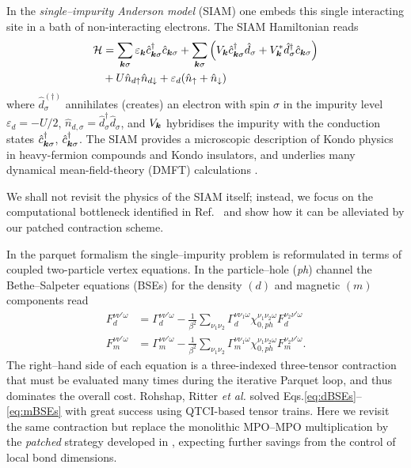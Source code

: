 In the \emph{single–impurity Anderson model} (SIAM) one embeds this single interacting site in a bath of non-interacting electrons. The SIAM Hamiltonian reads \cite{Hewson1993}
\begin{equation}
    \begin{aligned}
    \mathcal{H} &= \sum_{\boldsymbol{k}\sigma}\varepsilon_{\boldsymbol{k}}\hat{c}^\dag_{\boldsymbol{k}\sigma}\hat{c}_{\boldsymbol{k}\sigma} + \sum_{\boldsymbol{k}\sigma}\left( V_{\boldsymbol{k}}\hat{c}^\dag_{\boldsymbol{k}\sigma}\hat{d}_{\sigma} + V^*_{\boldsymbol{k}}\hat{d}^\dag_{\sigma}\hat{c}_{\boldsymbol{k}\sigma}\right) \\ &+ U\hat{n}_{d\uparrow}\hat{n}_{d\downarrow} + \varepsilon_d (\hat{n}_{\uparrow} + \hat{n}_{\downarrow})
        \end{aligned}
\end{equation}
where $\hat{d}^{(\dag)}_{\sigma}$ annihilates (creates) an electron with
spin $\sigma$ in the impurity level $\varepsilon_d=-U/2$, $\hat{n}_{d,\sigma}=\hat{d}^{\dag}_{\sigma}\hat{d}_{\sigma}$, and $V_{\boldsymbol{k}}$ hybridises the impurity with the conduction states $\hat{c}^\dag_{\boldsymbol{k}\sigma}$, $\hat{c}^\dag_{\boldsymbol{k}\sigma}$. The SIAM provides a microscopic description of Kondo physics in heavy-fermion compounds and Kondo insulators, and underlies many dynamical mean-field-theory (DMFT) calculations \cite{Schrieffer1966,Hewson1993, Georges1996}. 

We shall not revisit the physics of the SIAM itself; instead, we focus on the computational bottleneck identified in Ref.~\cite{Rohshap2025} and show how it can be alleviated by our patched contraction scheme.

In the parquet formalism \cite{Rohringer2012} the single–impurity problem is reformulated in terms of coupled two-particle vertex equations. In the particle–hole (\textit{ph}) channel the Bethe–Salpeter equations (BSEs) for the density $(d)$ and magnetic $(m)$ components read
\begin{align}
    F_{d}^{\nu\nu'\omega} &= \Gamma_d^{\nu\nu'\omega} - \frac{1}{\beta^2} \sum_{\nu_1\nu_2} \Gamma_d^{\nu\nu_1\omega}\chi_{0,ph}^{\nu_1\nu_2\omega}F_d^{\nu_2\nu'\omega}
    \label{eq:dBSEs}\\
    F_{m}^{\nu\nu'\omega} &= \Gamma_m^{\nu\nu'\omega} - \frac{1}{\beta^2} \sum_{\nu_1\nu_2} \Gamma_m^{\nu\nu_1\omega}\chi_{0,ph}^{\nu_1\nu_2\omega}F_m^{\nu_2\nu'\omega}.
    \label{eq:mBSEs}
\end{align} 
The right–hand side of each equation is a three-indexed three-tensor contraction that must be evaluated many times during the iterative Parquet loop, and thus dominates the overall cost. Rohshap, Ritter \textit{et al.} \cite{Rohshap2025} solved Eqs.\eqref{eq:dBSEs}–\eqref{eq:mBSEs} with great success using QTCI-based tensor trains. Here we revisit the same contraction but replace the monolithic MPO–MPO multiplication by the \emph{patched} strategy developed in , expecting further savings from the control of local bond dimensions.

